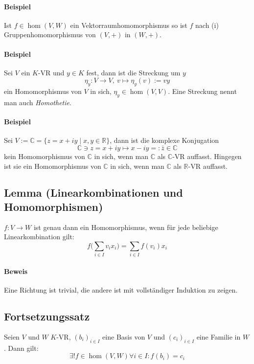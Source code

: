 \paragraph{Beispiel}
	Ist $f\in \hom(V,W)$ ein Vektorraumhomomorphismus so ist $ f $ nach (i) Gruppenhomomorphismus von $ (V,+) $ in $ (W,+) $.
  
\paragraph{Beispiel}
	Sei $ V $ ein $ K $-VR und $y\in K$ fest, dann ist die Streckung um $y$
	\[\eta_y:V\to V,\ v\mapsto \eta_y(v) := vy\]
	ein Homomorphismus von $ V $ in sich, $\eta_y\in \hom(V,V)$. Eine Streckung nennt man auch \emph{Homothetie}.
  	
\paragraph{Beispiel}
	Sei $V := \mathbb{C} = \{z = x+iy\mid x,y\in \mathbb{R}\}$, dann ist die komplexe Konjugation
	\[\mathbb{C}\ni z = x+iy \mapsto x-iy =: \bar{z} \in \mathbb{C}\]
	kein Homomorphismus von $\mathbb{C}$ in sich, wenn man $\mathbb{C}$ als $\mathbb{C}$-VR auffasst. Hingegen ist sie ein Homomorphismus von $\mathbb{C}$ in sich, wenn man $\mathbb{C}$ als $ \mathbb{R} $-VR auffasst.
	
\subsection{Lemma (Linearkombinationen und Homomorphismen)}
	\begin{Lemma}
		$f:V\to W$ ist genau dann ein Homomorphismus, wenn für jede beliebige Linearkombination gilt:
		\begin{equation*}
                    f\Big(\sum_{i\in I}v_ix_i\Big) = \sum_{i\in I}f(v_i)x_i
		\end{equation*}
	\end{Lemma}

\paragraph{Beweis}
	Eine Richtung ist trivial, die andere ist mit vollständiger Induktion zu zeigen.

\subsection{Fortsetzungssatz} 
	\begin{Satz}[Fortsetzungssatz]
		Seien $ V $ und $ W $ $K$-VR, $(b_i)_{i\in I}$ eine Basis von $ V $ und $(c_i)_{i\in I}$ eine Familie in $ W $.
	Dann gilt:
	\begin{equation*}
            \exists!f\in \hom(V,W) \forall i\in I: f(b_i) = c_i
        \end{equation*}
	\end{Satz}
    
